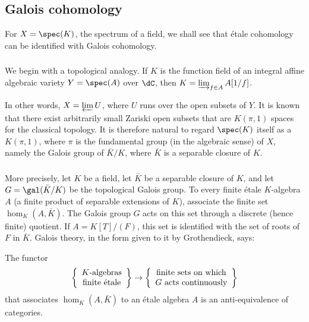 \subsection{Galois cohomology}\label{I:2-4}

For $X=\spec(K)$, the spectrum of a field, we shall see that étale
cohomology can be identified with Galois cohomology.

\subsubsection{}\label{I:2-4-1}

We begin with a topological analogy. If $K$ is the function field of an
integral affine algebraic variety $Y=\spec(A)$ over $\dC$, then
$K=\varinjlim_{f\in A}A[1/f]$.

In other words, $X=\varprojlim U$, where $U$ runs over the open subsets
of $Y$. It is known that there exist arbitrarily small Zariski open
subsets that are $K(\pi,1)$ spaces for the classical topology. It is
therefore natural to regard $\spec(K)$ itself as a $K(\pi,1)$, where
$\pi$ is the fundamental group (in the algebraic sense) of $X$, namely
the Galois group of $\bar K/K$, where $\bar K$ is a separable closure of
$K$.

\subsubsection{}\label{I:2-4-2}

More precisely, let $K$ be a field, let $\bar K$ be a separable closure
of $K$, and let $G=\gal(\bar K/K)$ be the topological Galois group. To
every finite étale $K$-algebra $A$ (a finite product of separable
extensions of $K$), associate the finite set $\hom_K(A,\bar K)$. The
Galois group $G$ acts on this set through a discrete (hence finite)
quotient. If $A=K[T]/(F)$, this set is identified with the set of roots
of $F$ in $\bar K$. Galois theory, in the form given to it by
Grothendieck, says:

\begin{proposition}\label{I:2-4-3}
The functor
\[
  \left\{\begin{array}{c}
          \textnormal{$K$-algebras} \\
          \textnormal{finite étale}
        \end{array}\right\}
  \to
  \left\{\begin{array}{c}
          \textnormal{finite sets on which} \\
          \textnormal{$G$ acts continuously}
        \end{array}\right\}
\]
that associates $\hom_K(A,\bar K)$ to an étale algebra $A$ is an
anti-equivalence of categories.
\end{proposition}

